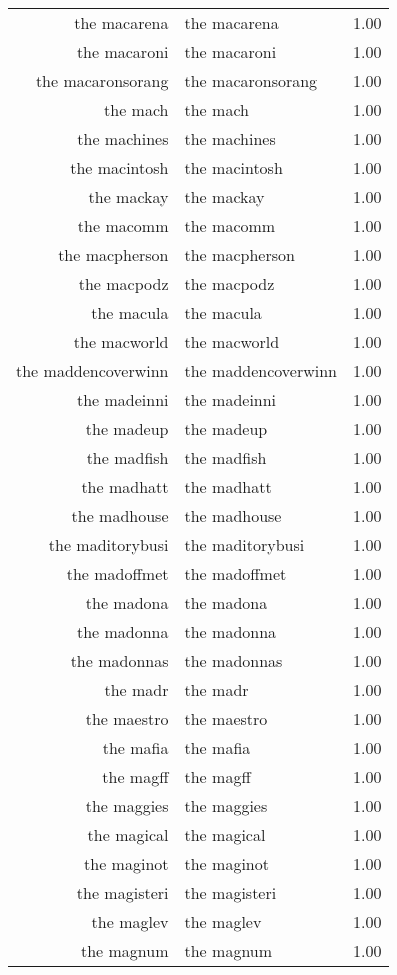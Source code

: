 \begin{table}[ht]
\begin{tabular}{rlr}
  the macarena & the macarena & 1.00 \\ 
  the macaroni & the macaroni & 1.00 \\ 
  the macaronsorang & the macaronsorang & 1.00 \\ 
  the mach & the mach & 1.00 \\ 
  the machines & the machines & 1.00 \\ 
  the macintosh & the macintosh & 1.00 \\ 
  the mackay & the mackay & 1.00 \\ 
  the macomm & the macomm & 1.00 \\ 
  the macpherson & the macpherson & 1.00 \\ 
  the macpodz & the macpodz & 1.00 \\ 
  the macula & the macula & 1.00 \\ 
  the macworld & the macworld & 1.00 \\ 
  the maddencoverwinn & the maddencoverwinn & 1.00 \\ 
  the madeinni & the madeinni & 1.00 \\ 
  the madeup & the madeup & 1.00 \\ 
  the madfish & the madfish & 1.00 \\ 
  the madhatt & the madhatt & 1.00 \\ 
  the madhouse & the madhouse & 1.00 \\ 
  the maditorybusi & the maditorybusi & 1.00 \\ 
  the madoffmet & the madoffmet & 1.00 \\ 
  the madona & the madona & 1.00 \\ 
  the madonna & the madonna & 1.00 \\ 
  the madonnas & the madonnas & 1.00 \\ 
  the madr & the madr & 1.00 \\ 
  the maestro & the maestro & 1.00 \\ 
  the mafia & the mafia & 1.00 \\ 
  the magff & the magff & 1.00 \\ 
  the maggies & the maggies & 1.00 \\ 
  the magical & the magical & 1.00 \\ 
  the maginot & the maginot & 1.00 \\ 
  the magisteri & the magisteri & 1.00 \\ 
  the maglev & the maglev & 1.00 \\ 
  the magnum & the magnum & 1.00 \\ 

\end{tabular}
\end{table}
